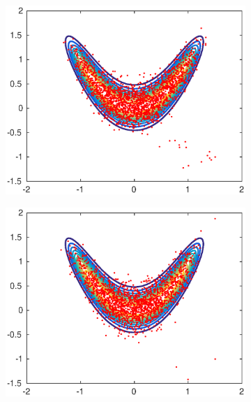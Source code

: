 \begin{figure}[t]
	\begin{subfigure}{0.32\linewidth}
		\includegraphics[width=1\linewidth]{plots/MHvsRAM/RAM_small}
	\end{subfigure}
	\begin{subfigure}{0.32\linewidth}
		\includegraphics[width=1\linewidth]{plots/MHvsRAM/RAM_medium}
	\end{subfigure}
	\begin{subfigure}{0.32\linewidth}

\end{subfigure}
\end{figure}
